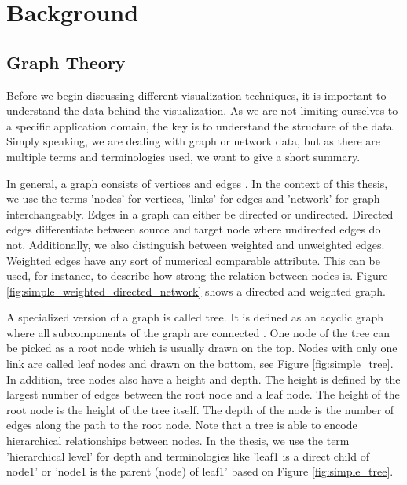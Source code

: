 \chapter{Background}

\section{Graph Theory}
\label{chap:bg-graphTheory}
Before we begin discussing different visualization techniques, it is important to understand the data behind the visualization. As we are not limiting ourselves to a specific application domain, the key is to understand the structure of the data. Simply speaking, we are dealing with graph or network data, but as there are multiple terms and terminologies used, we want to give a short summary. 

In general, a graph consists of vertices and edges \cite{diestel_graph_2017}. In the context of this thesis, we use the terms 'nodes' for vertices, 'links' for edges and 'network' for graph interchangeably. Edges in a graph can either be directed or undirected. Directed edges differentiate between source and target node where undirected edges do not. Additionally, we also distinguish between weighted and unweighted edges. Weighted edges have any sort of numerical comparable attribute. This can be used, for instance, to describe how strong the relation between nodes is. Figure \ref{fig:simple_weighted_directed_network} shows a directed and weighted graph.

A specialized version of a graph is called tree\label{exp:tree}. It is defined as an acyclic graph where all subcomponents of the graph are connected \cite{diestel_graph_2017}. One node of the tree can be picked as a root node which is usually drawn on the top. Nodes with only one link are called leaf nodes and drawn on the bottom, see Figure \ref{fig:simple_tree}.\\
In addition, tree nodes also have a height and depth. The height is defined by the largest number of edges between the root node and a leaf node. The height of the root node is the height of the tree itself. The depth of the node is the number of edges along the path to the root node. Note that a tree is able to encode hierarchical relationships between nodes. In the thesis, we use the term 'hierarchical level' for depth and terminologies like 'leaf1 is a direct child of node1' or 'node1 is the parent (node) of leaf1' based on Figure \ref{fig:simple_tree}.

